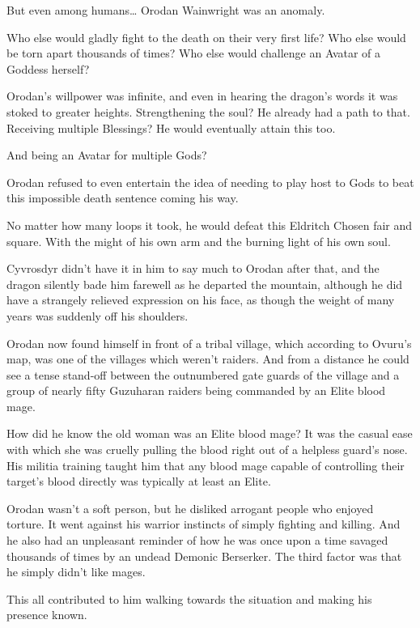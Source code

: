 \documentclass[a4paper,10pt]{book}
\begin{document}
But even among humans… Orodan Wainwright was an anomaly.\par
Who else would gladly fight to the death on their very first life? Who else would be torn apart thousands of times? Who else would challenge an Avatar of a Goddess herself?\par
Orodan’s willpower was infinite, and even in hearing the dragon’s words it was stoked to greater heights. Strengthening the soul? He already had a path to that. Receiving multiple Blessings? He would eventually attain this too.\par
And being an Avatar for multiple Gods?\par
Orodan refused to even entertain the idea of needing to play host to Gods to beat this impossible death sentence coming his way.\par
No matter how many loops it took, he would defeat this Eldritch Chosen fair and square. With the might of his own arm and the burning light of his own soul.\par
\par
Cyvrosdyr didn’t have it in him to say much to Orodan after that, and the dragon silently bade him farewell as he departed the mountain, although he did have a strangely relieved expression on his face, as though the weight of many years was suddenly off his shoulders.\par
Orodan now found himself in front of a tribal village, which according to Ovuru’s map, was one of the villages which weren’t raiders. And from a distance he could see a tense stand-off between the outnumbered gate guards of the village and a group of nearly fifty Guzuharan raiders being commanded by an Elite blood mage.\par
How did he know the old woman was an Elite blood mage? It was the casual ease with which she was cruelly pulling the blood right out of a helpless guard’s nose. His militia training taught him that any blood mage capable of controlling their target’s blood directly was typically at least an Elite.\par
Orodan wasn’t a soft person, but he disliked arrogant people who enjoyed torture. It went against his warrior instincts of simply fighting and killing. And he also had an unpleasant reminder of how he was once upon a time savaged thousands of times by an undead Demonic Berserker. The third factor was that he simply didn’t like mages.\par
This all contributed to him walking towards the situation and making his presence known.\par
\end{document}
